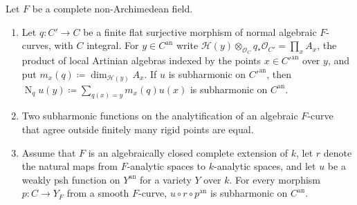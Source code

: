 \documentclass[11pt,a4paper]{article}
\newcommand{\an}{\mathrm{an}}          %
\newcommand{\Norm}{\operatorname{N}}
\begin{document}
\begin{lemma}\label{lem:curves}
Let $F$ be a complete non-Archimedean field.
\begin{enumerate}
\item Let $q\colon C'\to C$ be a finite flat surjective morphism of normal algebraic $F$-curves, with $C$ integral. For $y\in C^{\an}$ write $\mathcal H(y)\otimes_{\mathcal O_C}q_*\mathcal O_{C'}=\prod_xA_x$, the product of local Artinian algebras indexed by the points $x\in C'^{\an}$ over $y$, and put $m_x(q)\coloneqq\dim_{\mathcal H(y)}A_x$. If $u$ is subharmonic on $C'^{\an}$, then $\Norm_qu(y)\coloneqq\sum_{q(x)=y}m_x(q)u(x)$ is subharmonic on $C^{\an}$.
\item Two subharmonic functions on the analytification of an algebraic $F$-curve that agree outside finitely many rigid points are equal.
\item Assume that $F$ is an algebraically closed complete extension of $k$, let $r$ denote the natural maps from $F$-analytic spaces to $k$-analytic spaces, and let $u$ be a weakly psh function on $Y^{\an}$ for a variety $Y$ over $k$. For every morphism $p\colon C\to Y_F$ from a smooth $F$-curve, $u\circ r\circ p^{\an}$ is subharmonic on $C^{\an}$.
\end{enumerate}
\end{lemma}
\end{document}
